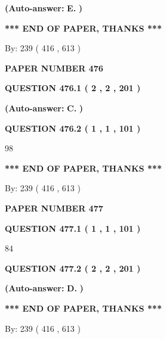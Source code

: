 \documentclass[12pt]{article}
\begin{document}
 
{\textbf{(Auto-answer:}}
{\textbf{\large{
E.}}}
{\textbf{)}}
 
 
   
   
   
   
\vspace{1.0in} 
{\textbf{\large{ *** END OF PAPER, THANKS *** }}} 
   
   
\hspace{1.0in} By: 
 239 ( 416 ,  613 )
   
   
   
   
\newpage 
\setcounter{page}{ 
   476001 } 
   
   
 {\textbf{ \Large{ PAPER NUMBER  476  }}}
   
   
   
   
  
  
{\textbf{\large{QUESTION
476.1 
 ( 2 , 2 , 201 )
}}}
 
 
{\textbf{(Auto-answer:}}
{\textbf{\large{
C.}}}
{\textbf{)}}
 
 
  
  
{\textbf{\large{QUESTION
476.2 
 ( 1 , 1 , 101 )
}}}

98
   
   
   
   
\vspace{1.0in} 
{\textbf{\large{ *** END OF PAPER, THANKS *** }}} 
   
   
\hspace{1.0in} By: 
 239 ( 416 ,  613 )
   
   
   
   
\newpage 
\setcounter{page}{ 
   477001 } 
   
   
 {\textbf{ \Large{ PAPER NUMBER  477  }}}
   
   
   
   
  
  
{\textbf{\large{QUESTION
477.1 
 ( 1 , 1 , 101 )
}}}

84
  
  
{\textbf{\large{QUESTION
477.2 
 ( 2 , 2 , 201 )
}}}
 
 
{\textbf{(Auto-answer:}}
{\textbf{\large{
D.}}}
{\textbf{)}}
 
 
   
   
   
   
\vspace{1.0in} 
{\textbf{\large{ *** END OF PAPER, THANKS *** }}} 
   
   
\hspace{1.0in} By: 
 239 ( 416 ,  613 )
   
   
   
\end{document}
